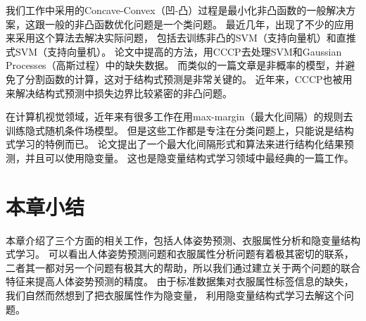 我们工作中采用的Concave-Convex（凹-凸）过程\cite{CCP}是最小化非凸函数的一般解决方案，这跟一般的非凸函数优化问题是一个类问题。
最近几年，出现了不少的应用来采用这个算法去解决实际问题，
包括去训练非凸的SVM（支持向量机）和直推式SVM（支持向量机）\cite{tcs}。
论文\cite{Vishwanathan05kernelmethods}中提高的方法，用CCCP去处理SVM和Gaussian Processes（高斯过程）中的缺失数据。
而类似的一篇文章\cite{llsvm}是非概率的模型，并避免了分割函数的计算，这对于结构式预测是非常关键的。
近年来，CCCP也被用来解决结构式预测中损失边界比较紧密的非凸问题\cite{boundSE}。

在计算机视觉领域，近年来有很多工作在用max-margin（最大化间隔）的规则去训练隐式随机条件场模型\cite{muldpm,maxHCRF}。
但是这些工作都是专注在分类问题上，只能说是结构式学习的特例而已。
论文\cite{muldpm}提出了一个最大化间隔形式和算法来进行结构化结果预测，并且可以使用隐变量。
这也是隐变量结构式学习领域中最经典的一篇工作。


\section{本章小结}
本章介绍了三个方面的相关工作，包括人体姿势预测、衣服属性分析和隐变量结构式学习。
可以看出人体姿势预测问题和衣服属性分析问题有着极其密切的联系，
二者其一都对另一个问题有极其大的帮助，所以我们通过建立关于两个问题的联合特征来提高人体姿势预测的精度。
由于标准数据集对衣服属性标签信息的缺失，我们自然而然想到了把衣服属性作为隐变量，
利用隐变量结构式学习去解这个问题。
